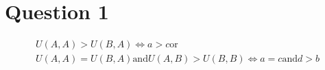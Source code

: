 \documentclass[11pt, a4paper]{article}
\title{\Large{\sc{\subjectname \\ \vspace{0.5cm} \large{\assignment}}}}
\author{\studentname (\studentno)}
\date{}
\begin{document}
\maketitle

\vspace{0.1cm}

\section*{Question 1} %
	\begin{align*}
	U(A,A) > U(B,A) \Leftrightarrow a > c \text{or}\\
	U(A,A) = U(B,A) \text{and} U(A,B) > U(B,B) \Leftrightarrow a = c \text{and} d > b \\
	\end{align*}
\end{document}
